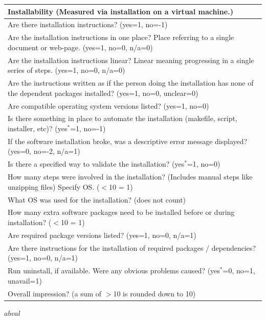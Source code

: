 \documentclass[letterpaper,cleveref]{lipics-v2019}
\begin{document}
\def\arraystretch{1.5}
\begin{tabular}{p{14cm}}
	\hline		
	\textbf{Installability (Measured via installation on a virtual machine.) }\\
	\hline
	Are there installation instructions? ({yes=1, no=-1})\\
	Are the installation instructions in one place? Place referring to a single
	document or web-page. ({yes=1, no=0, n/a=0})\\
	Are the installation instructions linear? Linear meaning progressing  in a
	single series of steps. ({yes=1, no=0, n/a=0})\\
	Are the instructions written as if the person doing the installation has none
	of the dependent packages installed? ({yes=1, no=0, unclear=0})\\
	Are compatible operating system versions listed? ({yes=1, no=0})\\
	Is there something in place to automate the installation (makefile, script,
	installer, etc)? ({yes$^*$=1, no=-1})\\
	If the software installation broke, was a descriptive error message displayed?
	({yes=0, no=-2, n/a=1})\\
	Is there a specified way to validate the installation? ({yes$^*$=1, no=0})\\
	How many steps were involved in the installation? (Includes manual steps like
	unzipping files) Specify OS. ($<$10 = 1)\\
	What OS was used for the installation? (does not count)\\
	How many extra software packages need to be installed before or during
	installation? ($<$10 = 1)\\
	Are required package versions listed? ({yes=1, no=0, n/a=1})\\
	Are there instructions for the installation of required packages /
	dependencies? ({yes=1, no=0, n/a=1})\\
	Run uninstall, if available. Were any obvious problems caused? ({yes$^*$=0, no=1,
	unavail=1})\\
	Overall impression? (a sum of $>$10 is rounded down to 10)\\
	\hline
\end{tabular}

$\mathit{ab} \mathit{val}$
\end{document}
